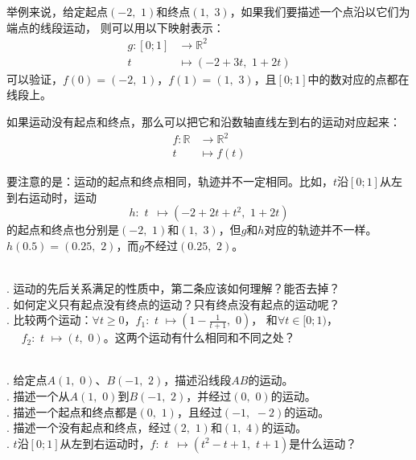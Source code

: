\documentclass[12pt,UTF8]{ctexbook}
\begin{document}
举例来说，给定起点$(-2,\,\,1)$和终点$(1,\,\,3)$，如果我们要描述一个点沿以它们为端点的线段运动，
则可以用以下映射表示：
\begin{align*}
    g: [0;1] &\rightarrow \mathbb{R}^2  \\
         t \,\,\, &\mapsto (-2 + 3t,\,\, 1 + 2t) 
\end{align*}
可以验证，$f(0) = (-2,\,\,1)$，$f(1) = (1,\,\,3)$，且$[0;1]$中的数对应的点都在线段上。

如果运动没有起点和终点，那么可以把它和沿数轴直线左到右的运动对应起来：
\begin{align*}
    f: \mathbb{R} &\rightarrow \mathbb{R}^2  \\
         t \, &\mapsto f(t) 
\end{align*}

要注意的是：运动的起点和终点相同，轨迹并不一定相同。比如，$t$沿$[0;1]$从左到右运动时，运动
$$ h: \,\, t \,\,\, \mapsto (-2 + 2t + t^2,\,\, 1 + 2t) $$
的起点和终点也分别是$(-2,\,\,1)$和$(1,\,\,3)$，但$g$和$h$对应的轨迹并不一样。
$h(0.5) = (0.25, \,\,2)$，而$g$不经过$(0.25, \,\,2)$。

\begin{sk}
    \mbox{} \\
    . 运动的先后关系满足的性质中，第二条应该如何理解？能否去掉？\\
    . 如何定义只有起点没有终点的运动？只有终点没有起点的运动呢？\\
    . 比较两个运动：$\forall t \geqslant 0$，$f_1:\,\, t \,\, \mapsto (1 - \frac{1}{t+1}, \,\, 0)$，
    和$\forall t \in [0; 1)$，\\
    \indent $\quad \,\, f_2:\,\, t \,\, \mapsto (t, \,\,0)$。这两个运动有什么相同和不同之处？
\end{sk}

\begin{xt}
    \mbox{} \\
    . 给定点$A(1,\,\,0)$、$B(-1,\,\,2)$，描述沿线段$AB$的运动。\\
    . 描述一个从$A(1,\,\,0)$到$B(-1,\,\,2)$，并经过$(0,\,\,0)$的运动。\\
    . 描述一个起点和终点都是$(0, \,\, 1)$，且经过$(-1,\,\, -2)$的运动。\\
    . 描述一个没有起点和终点，经过$(2,\,\, 1)$和$(1,\,\, 4)$的运动。\\
    . $t$沿$[0;1]$从左到右运动时，$f: \,\, t \,\,\, \mapsto (t^2 - t + 1, \,\, t + 1)$是什么运动？
\end{xt}
\end{document}
